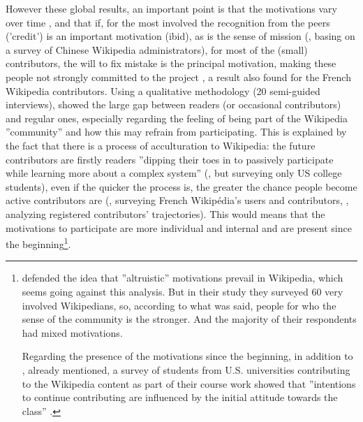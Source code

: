However these global results, an important point is that the motivations
vary over time \citep{ForteBruckman05,Bryantetal05}, and that if,
for the most involved the recognition from the peers ('credit') is
an important motivation (ibid), as is the sense of mission (\citealt{LiangChenHsu08},
basing on a survey of Chinese Wikipedia administrators), for most
of the (small) contributors, the will to fix mistake is the principal
motivation, making these people not strongly committed to the project
\citep[relying on a survey of Japan Wikipedia contributors]{Kamataetal10},
a result \citet{DejeanJullien15} also found for the French Wikipedia
contributors. Using a qualitative methodology (20 semi-guided interviews),
\citet{Antin11} showed the large gap between readers (or occasional
contributors) and regular ones, especially regarding the feeling of
being part of the Wikipedia ''community'' and how this may refrain
from participating. This is explained by the fact that there is a
process of acculturation to Wikipedia: the future contributors are
firstly readers ''dipping their toes in to passively participate
while learning more about a complex system'' (\citealp{AntinCheshire10},
but surveying only US college students), even if the quicker the process
is, the greater the chance people become active contributors are (\citealp{DejeanJullien15},
surveying French Wikipédia's users and contributors, \citealp{PancieraHalfakerTerveen09},
analyzing registered contributors' trajectories). This would means
that the motivations to participate are more individual and internal
and are present since the beginning\footnote{\citet{PrasarnphanichWagner09} defended the idea that ''altruistic''
motivations prevail in Wikipedia, which seems going against this analysis.
But in their study they surveyed 60 very involved Wikipedians, so,
according to what was said, people for who the sense of the community
is the stronger. And the majority of their respondents had mixed motivations.

Regarding the presence of the motivations since the beginning, in
addition to \citet{PancieraHalfakerTerveen09,DejeanJullien15}, already
mentioned, a survey of students from U.S. universities contributing
to the Wikipedia content as part of their course work showed that
''intentions to continue contributing are influenced by the initial
attitude towards the class'' \citep{Zubeetal12}.}. 

